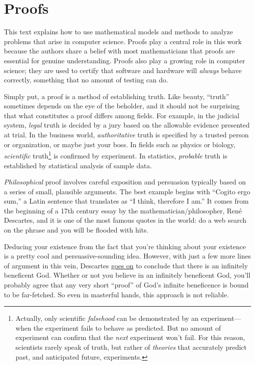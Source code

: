 \part{Proofs}
\label{part:proofs}

\partintro
This text explains how to use mathematical models and methods to analyze
problems that arise in computer science.  Proofs play a central role in
this work because the authors share a belief with most mathematicians that
proofs are essential for genuine understanding.  Proofs also play a
growing role in computer science; they are used to certify that software
and hardware will \emph{always} behave correctly, something that no amount
of testing can do.

Simply put, a proof is a method of establishing truth.  Like beauty,
``truth'' sometimes depends on the eye of the beholder, and it should
not be surprising that what constitutes a proof differs among fields.
For example, in the judicial system, \emph{legal} truth is decided by
a jury based on the allowable evidence presented at trial.  In the
business world, \emph{authoritative} truth is specified by a trusted
person or organization, or maybe just your boss.  In fields such as
physics or biology, \emph{scientific} truth\footnote{Actually, only
  scientific \emph{falsehood} can be demonstrated by an
  experiment---when the experiment fails to behave as predicted.  But
  no amount of experiment can confirm that the \emph{next} experiment
  won't fail.  For this reason, scientists rarely speak of truth, but
  rather of \emph{theories} that accurately predict past, and
  anticipated future, experiments.} is confirmed by experiment.  In statistics,
\emph{probable} truth is established by statistical analysis of sample
data.

\emph{Philosophical} proof involves careful exposition and
persuasion typically based on a series of small, plausible arguments.
The best example begins with ``Cogito ergo sum,'' a Latin sentence
that translates as ``I think, therefore I am.''  It comes from the
beginning of a 17th century essay by the mathematician/philosopher,
Ren\'e Descartes, and it is one of the most famous quotes in the
world: do a web search on the phrase and you will be flooded with
hits.

Deducing your existence from the fact that you're thinking about your
existence is a pretty cool and persuasive-sounding idea.  However,
with just a few more lines of argument in this vein, Descartes
\href{http://www.btinternet.com/~glynhughes/squashed/descartes.htm}{goes
  on} to conclude that there is an infinitely beneficent God.  Whether
or not you believe in an infinitely beneficent God, you'll probably
agree that any very short ``proof'' of God's infinite beneficence is
bound to be far-fetched.  So even in masterful hands, this approach is
not reliable.

